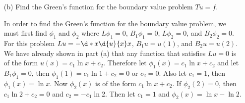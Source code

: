 \documentclass[11pt, oneside]{article}
\begin{document}
\begin{enumerate}
\begin{enumerate}
        \begin{proof}
          First note that clearly $0 \in N(T)$.
          Now consider $u \neq 0$ such that $u \in N(T)$, then
          \begin{align*}
            Tu &= 0 \\
            - \d*{x \d{u}{x}}{x} &= 0 \\
            \d*{x \d{u}{x}}{x} &= 0 \\
            x \d{u}{x} &= c_1 \\
            \d{u}{x} &= \frac{c_1}{x} \\
            u(x) &= \intt{\frac{c_1}{x}}{x} + c_2\\
            u(x) &= c_1 \ln{x} + c_2\\
          \end{align*}
          If $u \in D(T)$, then $u$ must satisfy $u(1) = u(2) = 0$.
          \begin{align*}
            u(1) &= c_1 \ln{1} + c_2 \\
            0 &= c_2 \\
            u(2) &= c_1 \ln{2} \\
            0 &= c_1
          \end{align*}
          This shows that $u = 0$, which contradicts that $u \neq 0$.
          This shows that $N(T) = \set{0}$.
        \end{proof}

      \item[(b)] %
        Find the Green's function for the boundary value problem $Tu = f$.

        In order to find the Green's function for the boundary value problem,
        we must first find $\phi_1$ and $\phi_2$ where $L\phi_1 = 0$,
        $B_1 \phi_1 = 0$, $L\phi_2 = 0$, and $B_2 \phi_2 = 0$.
        For this problem $Lu = - \d*{x \d{u}{x}}{x}$, $B_1 u = u(1)$, and $B_2 u = u(2)$.
        We have already shown in part (a) that any function that satisfies $Lu = 0$ is
        of the form $u(x) = c_1 \ln{x} + c_2$.
        Therefore let $\phi_1(x) = c_1 \ln{x} + c_2$ and let $B_1 \phi_1 = 0$,
        then $\phi_1(1) = c_1 \ln{1} + c_2 = 0$ or $c_2 = 0$.
        Also let $c_1 = 1$, then $\phi_1(x) = \ln{x}$.
        Now $\phi_2(x)$ is of the form $c_1 \ln{x} + c_2$.
        If $\phi_2(2) = 0$, then $c_1 \ln{2} + c_2 = 0$ and $c_2 = -c_1 \ln{2}$.
        Then let $c_1 = 1$ and $\phi_2(x) = \ln{x} - \ln{2}$.


\end{enumerate}
\end{enumerate}
\end{document}
